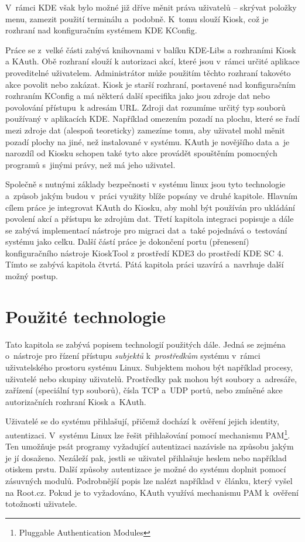 V~rámci KDE však bylo možné již dříve měnit práva uživatelů -- skrývat položky menu, zamezit použití terminálu a~podobně. K~tomu slouží Kiosk, což je rozhraní nad konfiguračním systémem KDE KConfig.

Práce se z~velké části zabývá knihovnami v balíku KDE-Libs a rozhraními Kiosk a KAuth. Obě rozhraní slouží k autorizaci akcí, které jsou v~rámci určité aplikace proveditelné uživatelem. Administrátor může použitím těchto rozhraní takovéto akce povolit nebo zakázat. Kiosk je starší rozhraní, postavené nad konfiguračním rozhraním KConfig a má některá další specifika jako jsou zdroje dat nebo povolování přístupu~k adresám URL. Zdroji dat rozumíme určitý typ souborů používaný v aplikacích KDE. Například omezením pozadí na plochu, které se řadí mezi zdroje dat (alespoň teoreticky) zamezíme tomu, aby uživatel mohl měnit pozadí plochy na jiné, než instalované v systému. KAuth je novějšího data a~je narozdíl od Kiosku schopen také tyto akce provádět spouštěním pomocných programů s~jinými právy, než má jeho uživatel.

Společně s nutnými základy bezpečnosti v systému linux jsou tyto technologie a~způsob jakým budou v~práci využity blíže popsány ve druhé kapitole. Hlavním cílem práce je integrovat KAuth do Kiosku, aby mohl být používán pro ukládání povolení akcí a přístupu ke zdrojům dat. Třetí kapitola integraci popisuje a dále se zabývá implementací nástroje pro migraci dat a~také pojednává o~testování systému jako celku. Další částí práce je dokončení portu (přenesení) konfiguračního nástroje KioskTool z prostředí KDE3 do prostředí KDE SC 4. Tímto se zabývá kapitola čtvrtá. Pátá kapitola práci uzavírá a~navrhuje další možný postup.

\chapter{Použité technologie}
Tato kapitola se zabývá popisem technologií použitých dále. Jedná se zejména o~nástroje pro řízení přístupu \emph{subjektů} k~\emph{prostředkům} systému v~rámci uživatelského prostoru systému Linux. Subjektem mohou být například procesy, uživatelé nebo skupiny uživatelů. Prostředky pak mohou být soubory a~adresáře, zařízení (speciální typ souborů), čísla TCP a~UDP portů, nebo zmíněné akce autorizačních rozhraní Kiosk a~KAuth.

Uživatelé se do systému přihlašují, přičemž dochází k~ověření jejich identity, autentizaci. V~systému Linux lze řešit přihlašování pomocí mechanismu PAM\footnote{Pluggable Authentication Modules}. Ten umožňuje psát programy vyžadující autentizaci nazávisle na způsobu jakým je jí dosaženo. Nezáleží pak, jestli se uživatel přihlašuje heslem nebo například otiskem prstu. Další způsoby autentizace je možné do systému doplnit pomocí zásuvných modulů. Podrobnější popis lze nalézt například v~článku, který vyšel na Root.cz\cite{rootpam}. Pokud je to vyžadováno, KAuth využívá mechanismu PAM k~ověření totožnosti uživatele.

